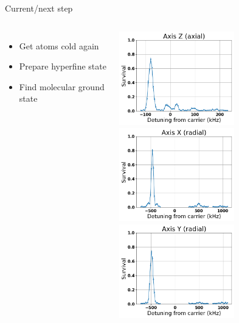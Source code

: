 \documentclass{beamer}
\begin{document}
\begin{frame}{Current/next step}
  \begin{columns}
    \column{6cm}
    \vspace{1cm}
    \begin{itemize}
    \item Get atoms cold again
    \item Prepare hyperfine state
    \item Find molecular ground state
    \end{itemize}
    \vspace{1.2cm}
    \includegraphics[width=5cm]{../../experiments/na_rsc_201709/imgs/data_20170917_220050_az.png}
    \column{6cm}
    \includegraphics[width=5cm]{../../experiments/na_rsc_201709/imgs/data_20170917_220050_rx.png}\\
    \includegraphics[width=5cm]{../../experiments/na_rsc_201709/imgs/data_20170917_220050_ry.png}
  \end{columns}
\end{frame}
\end{document}
